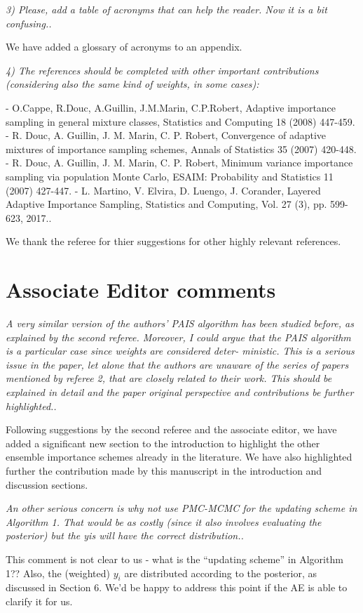 \documentclass{article}
\newcommand{\comment}[2]{\vspace{0.6cm}{\bf Comment:} {\it #1.}

\vspace{0.3cm}{\bf Answer:} #2}
\begin{document}
\comment{3) Please, add a table of acronyms that can help the reader. Now it is a bit confusing.}{We have added a glossary of acronyms to an appendix.} %

\comment{4) The references should be completed with other important contributions (considering also the same kind of weights, in some cases): 

- O.Cappe, R.Douc, A.Guillin, J.M.Marin, C.P.Robert, Adaptive importance sampling in general mixture classes, Statistics and Computing 18 (2008) 447-459. 
- R. Douc, A. Guillin, J. M. Marin, C. P. Robert, Convergence of adaptive mixtures of importance sampling schemes, Annals of Statistics 35 (2007) 420-448. 
- R. Douc, A. Guillin, J. M. Marin, C. P. Robert, Minimum variance importance sampling via population Monte Carlo, ESAIM: Probability and Statistics 11 (2007) 427-447. 
- L. Martino, V. Elvira, D. Luengo, J. Corander, Layered Adaptive Importance Sampling, Statistics and Computing, Vol. 27 (3), pp. 599-623, 2017.}{We thank the referee for thier suggestions for other highly relevant references.} %

\section*{Associate Editor comments}
\comment{A very similar version of the authors’ PAIS algorithm has been studied before, as explained by the second referee. Moreover, I could argue that the PAIS algorithm is a particular case since weights are considered deter- ministic. This is a serious issue in the paper, let alone that the authors are unaware of the series of papers mentioned by referee 2, that are closely related to their work.
This should be explained in detail and the paper original perspective and contributions be further highlighted.}{Following suggestions by the second referee and the associate editor, we have added a significant new section to the introduction to highlight the other ensemble importance schemes already in the literature. We have also highlighted further the contribution made by this manuscript in the introduction and discussion sections.}%

\comment{An other serious concern is why not use PMC-MCMC for the updating scheme in Algorithm 1. That would be as costly (since it also involves evaluating the posterior) but the yis will have the correct distribution.}{This comment is not clear to us - what is the ``updating scheme'' in Algorithm 1?? Also, the (weighted) $y_i$ are distributed according to the posterior, as discussed in Section 6. We'd be happy to address this point if the AE is able to clarify it for us.}%
\end{document}
